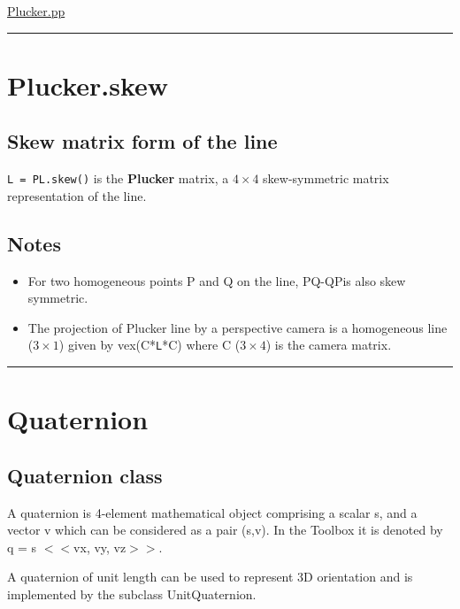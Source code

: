 \hyperlink{Plucker.pp}{\color{blue} Plucker.pp}

\vspace{1.5ex}\hrule

\hypertarget{Plucker.skew}{\section*{Plucker.skew}}
\subsection*{Skew matrix form of the line}


\texttt{L = PL.skew()} is the \textbf{\color{red} Plucker} matrix, a $4 \times 4$ skew-symmetric matrix
representation of the line.


\subsection*{Notes}
\begin{itemize}
  \item For two homogeneous points P and Q on the line, PQ\textquotesingle -QP\textquotesingle  is also skew     symmetric.
  \item The projection of Plucker line by a perspective camera is a homogeneous line ($3 \times 1$)     given by vex(C*\texttt{L}*C\textquotesingle ) where C ($3 \times 4$) is the camera matrix.
\end{itemize}
\vspace{1.5ex}\rule{\textwidth}{1mm}

\hypertarget{Quaternion}{\section*{Quaternion}}
\subsection*{Quaternion class}


A quaternion is 4-element mathematical object comprising a scalar s, and
a vector v which can be considered as a pair (s,v).  In the Toolbox it is
denoted by q = s $<$$<$vx, vy, vz$>$$>$.



A quaternion of unit length can be used to represent 3D orientation and
is implemented by the subclass UnitQuaternion.


